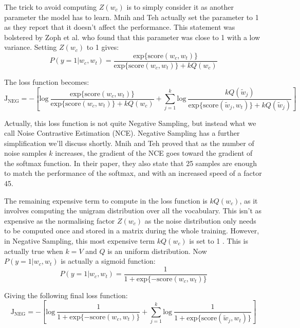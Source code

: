 The trick to avoid computing $Z(w_c)$ is to simply consider it as another parameter the model has to learn. Mnih and Teh \cite{nce} actually set the parameter to 1 as they report that it doesn't affect the performance. This statement was bolstered by Zoph et al. \cite{nce2} who found that this parameter was close to 1 with a low variance. Setting $Z(w_c)$ to 1 gives:
\begin{equation}
    P(y=1| w_c, w_t) = \frac{\text{exp}\{\text{score}(w_c, w_t)\}}{\text{exp}\{\text{score}(w_c, w_t)\} + kQ(w_c)}
\end{equation}

The loss function becomes:
\begin{equation}
    \text{J}_{\text{NEG}}  = -\left[\text{log}~\frac{\text{exp}\{\text{score}(w_c, w_t)\}}{\text{exp}\{\text{score}(w_c, w_t)\} + kQ(w_c)} + \sum_{j=1}^k\text{log}~\frac{kQ(\tilde{w}_j)}{\text{exp}\{\text{score}(\tilde{w}_j, w_t)\} + kQ(\tilde{w}_j)}\right]
\end{equation}

Actually, this loss function is not quite Negative Sampling, but instead what we call Noise Contrastive Estimation (NCE). Negative Sampling has a further simplification we'll discuss shortly. Mnih and Teh \cite{nce} proved that as the number of noise samples $k$ increases, the gradient of the NCE goes toward the gradient of the softmax function. In their paper, they also state that 25 samples are enough to match the performance of the softmax, and with an increased speed of a factor 45.

\newpage
The remaining expensive term to compute in the loss function is $kQ(w_c)$, as it involves computing the unigram distribution over all the vocabulary. This isn't as expensive as the normalising factor $Z(w_c)$ as the noise distribution only needs to be computed once and stored in a matrix during the whole training. However, in Negative Sampling, this most expensive term $kQ(w_c)$ is set to 1 \cite{word2vec2}. This is actually true when $k=V$ and $Q$ is an uniform distribution.	 Now $P(y=1| w_c, w_t)$ is actually a sigmoid function:
\begin{equation}
    P(y=1| w_c, w_t) = \frac{1}{1 + \text{exp}\{-\text{score}(w_c, w_t)\}}
\end{equation}

Giving the following final loss function:
\begin{equation}
    \text{J}_{\text{NEG}} = -\left[\text{log}~\frac{1}{1 + \text{exp}\{-\text{score}(w_c, w_t)\}} + \sum_{j=1}^k\text{log}~\frac{1}{1 + \text{exp}\{\text{score}(\tilde{w}_j, w_t)\}}\right]
\end{equation}

